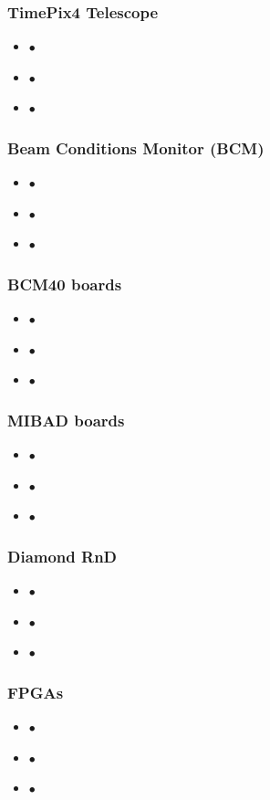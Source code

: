 \documentclass[aspectratio=1610, 12pt, xcolor=dvipsnames]{beamer}
\begin{document}
\begin{frame}\frametitle{TimePix4 Telescope}
  \begin{itemize}
    \item $\bullet$\,
    \item $\bullet$\,
    \item $\bullet$\,
  \end{itemize}
\end{frame}

\begin{frame}\frametitle{Beam Conditions Monitor (BCM)}
  \begin{itemize}
    \item $\bullet$\,
    \item $\bullet$\,
    \item $\bullet$\,
  \end{itemize}
\end{frame}

\begin{frame}\frametitle{BCM40 boards}
  \begin{itemize}
    \item $\bullet$\,
    \item $\bullet$\,
    \item $\bullet$\,
  \end{itemize}
\end{frame}

\begin{frame}\frametitle{MIBAD boards}
  \begin{itemize}
    \item $\bullet$\,
    \item $\bullet$\,
    \item $\bullet$\,
  \end{itemize}
\end{frame}

\begin{frame}\frametitle{Diamond RnD}
  \begin{itemize}
    \item $\bullet$\,
    \item $\bullet$\,
    \item $\bullet$\,
  \end{itemize}
\end{frame}

\begin{frame}\frametitle{FPGAs}
  \begin{itemize}
    \item $\bullet$\,
    \item $\bullet$\,
    \item $\bullet$\,
  \end{itemize}
\end{frame}
\end{document}
